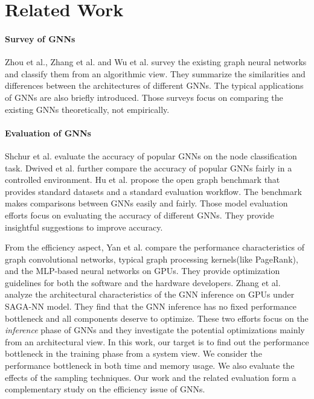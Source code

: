 \section{Related Work}
\label{sec:related_work}

\paragraph{Survey of GNNs}
Zhou et al.\cite{zhou2018_gnn_review}, Zhang et al.\cite{zhang2018_gnn_survey} and Wu et al.\cite{comprehensive-survey-wu-2020} survey the existing graph neural networks and classify them from an algorithmic view.
They summarize the similarities and differences between the architectures of different GNNs.
The typical applications of GNNs are also briefly introduced.
Those surveys focus on comparing the existing GNNs theoretically, not empirically.

\paragraph{Evaluation of GNNs}
Shchur et al. \cite{shchur2018_pitfall_of_gnn} evaluate the accuracy of popular GNNs on the node classification task.
Dwived et al. \cite{dwivedi2020_benchmark_of_gnn} further compare the accuracy of popular GNNs fairly in a controlled environment.
Hu et al. \cite{weihua2020_ogb-benchmark} propose the open graph benchmark that provides standard datasets and a standard evaluation workflow.
The benchmark makes comparisons between GNNs easily and fairly.
Those model evaluation efforts focus on evaluating the accuracy of different GNNs.
They provide insightful suggestions to improve accuracy.

From the efficiency aspect, Yan et al. \cite{yan2020_characterizing_gcn} compare the performance characteristics of graph convolutional networks, typical graph processing kernels(like PageRank), and the MLP-based neural networks on GPUs.
They provide optimization guidelines for both the software and the hardware developers.
Zhang et al. \cite{zhang2020_analysis_neugraph} analyze the architectural characteristics of the GNN inference on GPUs under SAGA-NN \cite{ma2019_neugraph} model.
They find that the GNN inference has no fixed performance bottleneck and all components deserve to optimize.
These two efforts focus on the \emph{inference} phase of GNNs and they investigate the potential optimizations mainly from an architectural view.
In this work, our target is to find out the performance bottleneck in the training phase from a system view.
We consider the performance bottleneck in both time and memory usage.
We also evaluate the effects of the sampling techniques.
Our work and the related evaluation\cite{yan2020_characterizing_gcn, zhang2020_analysis_neugraph} form a complementary study on the efficiency issue of GNNs.

